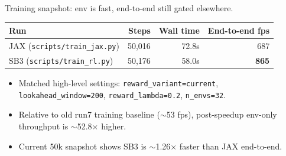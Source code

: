 \documentclass[11pt,aspectratio=43]{beamer}
\begin{document}
\begin{frame}{Training snapshot: env is fast, end-to-end still gated elsewhere.}

  \small
  \begin{center}
    \begin{tabular}{@{}lrrr@{}}
      \toprule
      Run & Steps & Wall time & End-to-end fps \\
      \midrule
      JAX (\texttt{scripts/train\_jax.py}) & 50{,}016 & 72.8s & 687 \\
      SB3 (\texttt{scripts/train\_rl.py}) & 50{,}176 & 58.0s & \textbf{865} \\
      \bottomrule
    \end{tabular}
  \end{center}

  \vspace{0.8em}
  \begin{itemize}
    \setlength{\itemsep}{0.65em}
    \item Matched high-level settings: \texttt{reward\_variant=current}, \texttt{lookahead\_window=200}, \texttt{reward\_lambda=0.2}, \texttt{n\_envs=32}.
    \item Relative to old run7 training baseline (\(\sim\)53 fps), post-speedup env-only throughput is \(\sim\)52.8\(\times\) higher.
    \item Current 50k snapshot shows SB3 is \(\sim\)1.26\(\times\) faster than JAX end-to-end.
  \end{itemize}

\end{frame}
\end{document}
